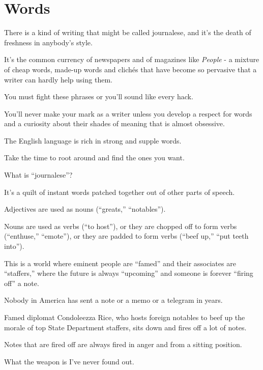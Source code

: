 \documentclass{book}
\numberwithin{equation}{section}
\begin{document}
\chapter{Words}

There is a kind of writing that might be called journalese, and it's the death of freshness in anybody's style.

It's the common currency of newspapers and of magazines like \textit{People} - a mixture of cheap words, made-up words and clich\'es that have become so pervasive that a writer can hardly help using them.

You must fight these phrases or you'll sound like every hack.

You'll never make your mark as a writer unless you develop a respect for words and a curiosity about their shades of meaning that is almost obsessive.

The English language is rich in strong and supple words.

Take the time to root around and find the ones you want.

%
What is ``journalese''?

It's a quilt of instant words patched together out of other parts of speech.

Adjectives are used as nouns (``greats,'' ``notables'').

Nouns are used as verbs (``to host''), or they are chopped off to form verbs (``enthuse,'' ``emote''), or they are padded to form verbs (``beef up,'' ``put teeth into'').

This is a world where eminent people are ``famed'' and their associates are ``staffers,'' where the future is always ``upcoming'' and someone is forever ``firing off'' a note.

Nobody in America has sent a note or a memo or a telegram in years.

Famed diplomat Condoleezza Rice, who hosts foreign notables to beef up the morale of top State Department staffers, sits down and fires off a lot of notes.

Notes that are fired off are always fired in anger and from a sitting position.

What the weapon is I've never found out.
\end{document}
